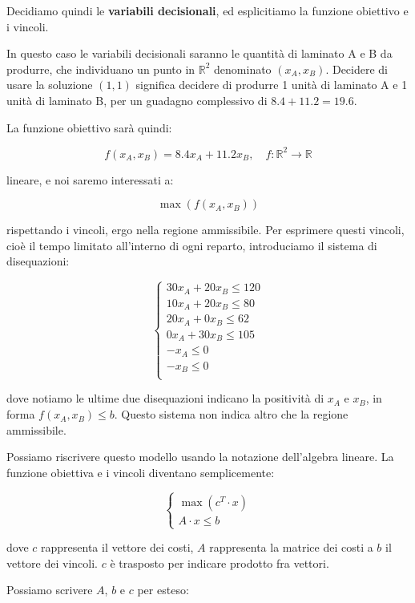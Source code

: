 \documentclass[a4paper,11pt]{article}
\begin{document}
Decidiamo quindi le \textbf{variabili decisionali}, ed esplicitiamo la funzione obiettivo e i vincoli.

In questo caso le variabili decisionali saranno le quantità di laminato A e B da produrre, che individuano un punto in $ \mathbb{R}^2 $ denominato $ ( x_A, x_B ) $. 
Decidere di usare la soluzione $ (1,1) $ significa decidere di produrre 1 unità di laminato A e 1 unità di laminato B, per un guadagno complessivo di $ 8.4 + 11.2 = 19.6 $.

La funzione obiettivo sarà quindi:

$$ f(x_A, x_B) = 8.4 x_A + 11.2 x_B, \quad f: \mathbb{R}^2 \rightarrow \mathbb{R} $$

lineare, e noi saremo interessati a:

$$ \max(f(x_A, x_B)) $$

rispettando i vincoli, ergo nella regione ammissibile.
Per esprimere questi vincoli, cioè il tempo limitato all'interno di ogni reparto, introduciamo il sistema di disequazioni:

\[
	\begin{cases}
		30 x_A + 20 x_B \leq 120 \\
		10 x_A + 20 x_B \leq 80	\\
		20 x_A + 0 x_B \leq 62 \\	
		0 x_A + 30 x_B \leq 105 \\
		- x_A \leq 0 \\
		- x_B \leq 0 \\
	\end{cases}
\]

dove notiamo le ultime due disequazioni indicano la positività di $x_A$ e $x_B$, in forma $ f(x_A, x_B) \leq b $.
Questo sistema non indica altro che la regione ammissibile.

Possiamo riscrivere questo modello usando la notazione dell'algebra lineare.
La funzione obiettiva e i vincoli diventano semplicemente:

\[
	\begin{cases}
		\max(c^T \cdot x) \\
		A \cdot x \leq b	
	\end{cases}
\]

dove $c$ rappresenta il vettore dei costi, $A$ rappresenta la matrice dei costi a $b$ il vettore dei vincoli.
$c$ è trasposto per indicare prodotto fra vettori.

Possiamo scrivere $A$, $b$ e $c$ per esteso:
\end{document}
